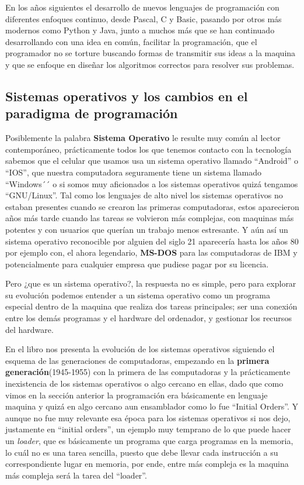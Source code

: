 \documentclass[letterpaper,12pt,oneside]{book}
\begin{document}
		
		En los años siguientes el desarrollo de nuevos lenguajes de programación con diferentes enfoques continuo, desde Pascal, C y Basic, pasando por otros más modernos 
		como Python y Java, junto a muchos más que
		se han continuado desarrollando con una idea en común, facilitar la programación, que el programador no se torture buscando formas de transmitir sus
		ideas a la maquina y que se enfoque en diseñar los algoritmos correctos para resolver sus problemas.
		


		\clearpage
		\subsection{Sistemas operativos y los cambios en el paradigma de programación}
		
		Posiblemente la palabra \textbf{Sistema Operativo} le resulte muy común al lector contemporáneo, prácticamente todos los que tenemos contacto con
		la tecnología sabemos que el celular que usamos usa un sistema operativo llamado ``Android'' o ``IOS'', que nuestra computadora seguramente tiene
		un sistema llamado ``Windows´´ o si somos muy aficionados a los sistemas operativos quizá tengamos ``GNU/Linux''. Tal como los lenguajes
		de alto nivel los sistemas operativos no estaban presentes cuando se crearon las primeras computadoras, estos aparecieron años más tarde cuando
		las tareas se volvieron más complejas, con maquinas más potentes y con usuarios que querían un trabajo menos estresante. Y aún así un sistema operativo
		reconocible por alguien del siglo 21 aparecería hasta los años 80 por ejemplo con, el ahora legendario, \textbf{MS-DOS} para las computadoras de IBM y potencialmente
		para cualquier empresa que pudiese pagar por su licencia.
		
		Pero ¿que es un sistema operativo?, la respuesta no es simple, pero para explorar su evolución podemos entender a un sistema operativo como un programa especial 
		dentro de la maquina que realiza dos tareas principales; ser una conexión entre los demás programas y el hardware del ordenador, 
		y gestionar los recursos del hardware\cite{tanenbaum_modern_2002}.
		
		En el libro \cite{tanenbaum_modern_2002} nos presenta la evolución de los sistemas operativos siguiendo
		el esquema de las generaciones de computadoras, empezando en
		la \textbf{primera generación}(1945-1955) con la primera de las computadoras y la prácticamente inexistencia de los sistemas operativos o algo cercano en ellas,
		dado que como vimos en la sección anterior la programación era básicamente en lenguaje maquina y quizá en algo cercano aun ensamblador como
		lo fue ``Initial Orders''. Y aunque no fue muy relevante esa época para los sistemas operativos si nos dejo, justamente en ``initial orders'', un ejemplo
		muy temprano de lo que puede hacer un \textit{loader}, que es básicamente un programa que carga programas en la memoria, lo cuál no es una tarea sencilla,
		puesto que debe llevar cada instrucción a su correspondiente lugar en memoria, por ende, entre más compleja es la maquina más compleja
		será la tarea del ``loader''\cite{salomon_assemblers_1992}.
		
\end{document}
